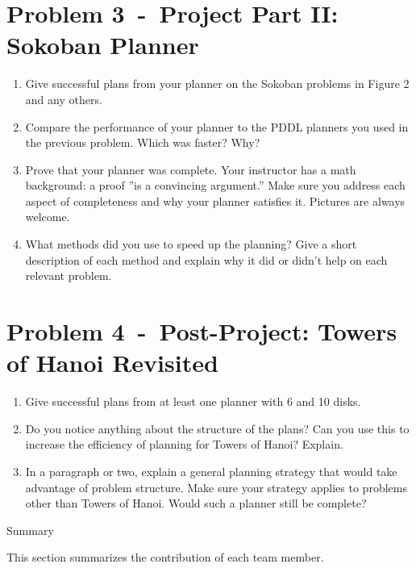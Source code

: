 \documentclass[12pt]{article}
\newcommand{\problem}[2]{\section*{Problem {#1}~-~{#2}}}
\begin{document}
\problem{3}{Project Part II: Sokoban Planner}
\label{sec:problem_3}
\begin{enumerate}
  \item Give successful plans from your planner on the Sokoban problems in Figure 2 and any others.
  \item Compare the performance of your planner to the PDDL planners you used in the previous
problem. Which was faster? Why?
  \item Prove that your planner was complete. Your instructor has a math background: a proof ”is
a convincing argument.” Make sure you address each aspect of completeness and why your
planner satisfies it. Pictures are always welcome.
  \item What methods did you use to speed up the planning? Give a short description of each method and explain why it did or didn't help on each relevant problem.
\end{enumerate}

\problem{4}{Post-Project: Towers of Hanoi Revisited}
\label{sec:problem_4}
\begin{enumerate}
 \item Give successful plans from at least one planner with 6 and 10 disks.
 \item Do you notice anything about the structure of the plans? Can you use this to increase the
efficiency of planning for Towers of Hanoi? Explain.
 \item In a paragraph or two, explain a general planning strategy that would take advantage of
problem structure. Make sure your strategy applies to problems other than Towers of Hanoi.
Would such a planner still be complete?
\end{enumerate}

\newpage
\begin{center}
\Huge{Summary} 
\end{center}
This section summarizes the contribution of each team member. 
\end{document}
